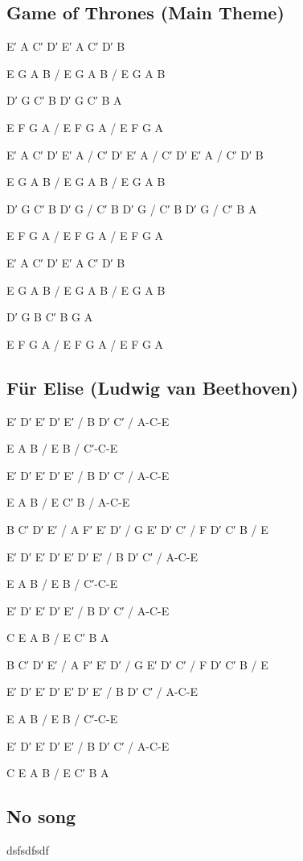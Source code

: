 \documentclass{memoir}
\newenvironment{song}[1]
{ 
\subsection{#1}   
\noindent \huge \ttfamily \par
}
{  \clearpage
}
\begin{document}
\begin{song}{ Game of Thrones (Main Theme)}
E′ A C′ D′ E′ A C′ D′ B

E G A B / E G A B / E G A B

D′ G C′ B D′ G C′ B A

E F G A / E F G A / E F G A

E′ A C′ D′ E′ A / C′ D′ E′ A / C′ D′ E′ A / C′ D′ B

E G A B / E G A B / E G A B

D′ G C′ B D′ G / C′ B D′ G / C′ B D′ G / C′ B A

E F G A / E F G A / E F G A

E′ A C′ D′ E′ A C′ D′ B

E G A B / E G A B / E G A B

D′ G B C′ B G A

E F G A / E F G A / E F G A

\end{song}
\begin{song}{Für Elise (Ludwig van Beethoven) }

E′ D′ E′ D′ E′ / B D′ C′ / A-C-E

E A B / E B / C′-C-E

E′ D′ E′ D′ E′ / B D′ C′ / A-C-E

E A B / E C′ B / A-C-E

B C′ D′ E′ / A F′ E′ D′ / G E′ D′ C′ / F D′ C′ B / E

E′ D′ E′ D′ E′ D′ E′ / B D′ C′ / A-C-E

E A B / E B / C′-C-E

E′ D′ E′ D′ E′ / B D′ C′ / A-C-E

C E A B / E C′ B A

B C′ D′ E′ / A F′ E′ D′ / G E′ D′ C′ / F D′ C′ B / E

E′ D′ E′ D′ E′ D′ E′ / B D′ C′ / A-C-E

E A B / E B / C′-C-E

E′ D′ E′ D′ E′ / B D′ C′ / A-C-E

C E A B / E C′ B A

\end{song}

\begin{song}{No song}
dsfsdfsdf
\end{song}
\end{document}
